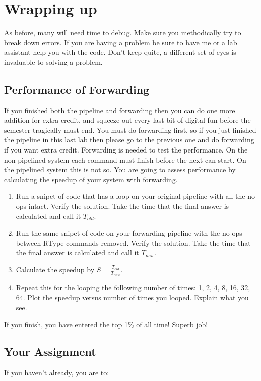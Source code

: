 \chapter{Wrapping up}

As before, many will need time to debug.  Make sure you methodically try to break down errors.  If you are having a problem be sure to have me or a lab assistant help you with the code.  Don't keep quite, a different set of eyes is invaluable to solving a problem.

\section{Performance of Forwarding}
If you finished both the pipeline and forwarding then you can do one more addition for extra credit, and squeeze out every last bit of digital fun before the semester tragically must end.  You must do forwarding first, so if you just finished the pipeline in this last lab then please go to the previous one and do forwarding if you want extra credit.  Forwarding is needed to test the performance.  On the non-pipelined system each command must finish before the next can start.  On the pipelined system this is not so.  You are going to assess performance by calculating the speedup of your system with forwarding.
\begin{enumerate}
\item Run a snipet of code that has a loop on your original pipeline with all the no-ops intact.  Verify the solution.  Take the time that the final answer is calculated and call it $T_{old}$.
\item Run the same snipet of code on your forwarding pipeline with the no-ops between RType commands removed.  Verify the solution.  Take the time that the final answer is calculated and call it $T_{new}$.
\item Calculate the speedup by $S=\frac{T_{old}}{T_{new}}$.
\item Repeat this for the looping the following number of times: 1, 2, 4, 8, 16, 32, 64.  Plot the speedup versus number of times you looped.  Explain what you see.
\end{enumerate}
If you finish, you have entered the top 1\% of all time!  Superb job!

\section{Your Assignment}

If you haven't already, you are to:

